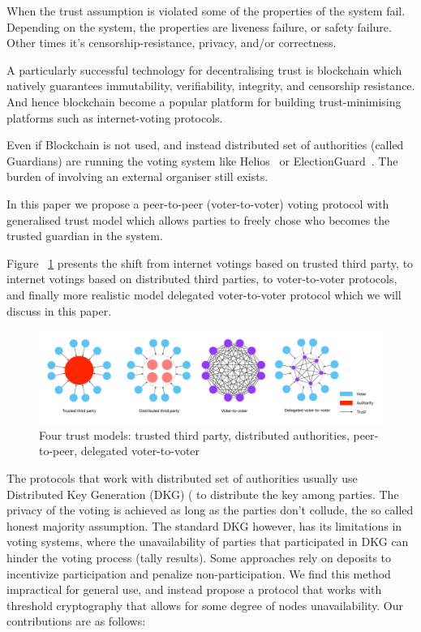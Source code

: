 \documentclass[runningheads]{llncs}
\begin{document}
When the trust assumption is violated some of the properties of the system fail. Depending on the system, the properties are liveness failure, or safety failure. Other times it's censorship-resistance, privacy, and/or correctness.

A particularly successful technology for decentralising trust is blockchain which natively guarantees immutability, verifiability, integrity, and censorship resistance. And hence blockchain become a popular platform for building trust-minimising platforms such as internet-voting protocols.

Even if Blockchain is not used, and instead distributed set of authorities (called Guardians) are running the voting system like Helios~\cite{adidaHeliosWebbasedOpenAudit2008} or ElectionGuard~\cite{ElectionGuard}. The burden of involving an external organiser still exists.

In this paper we propose a peer-to-peer (voter-to-voter) voting protocol with generalised trust model which allows parties to freely chose who becomes the trusted guardian in the system. 

Figure ~\ref{fig:trust-models} presents the shift from internet votings based on trusted third party, to internet votings based on distributed third parties, to voter-to-voter protocols, and finally more realistic model delegated voter-to-voter protocol which we will discuss in this paper.

\begin{figure}
    \centering
    \includegraphics[width=\textwidth]{trust-models-voting.pdf}
    \caption{Four trust models: trusted third party, distributed authorities, peer-to-peer, delegated voter-to-voter}
    \label{fig:trust-models}
\end{figure}

The protocols that work with distributed set of authorities usually use Distributed Key Generation (DKG) (%
to distribute the key among parties. The privacy of the voting is achieved as long as the parties don't collude, the so called honest majority assumption. The standard DKG however, has its limitations in voting systems, where the unavailability of parties that participated in DKG can hinder the voting process (tally results). %
Some approaches rely on deposits %
to incentivize participation and penalize non-participation. We find this method impractical for general use, and instead propose a protocol that works with threshold cryptography that allows for some degree of nodes unavailability. Our contributions are as follows:
\end{document}
